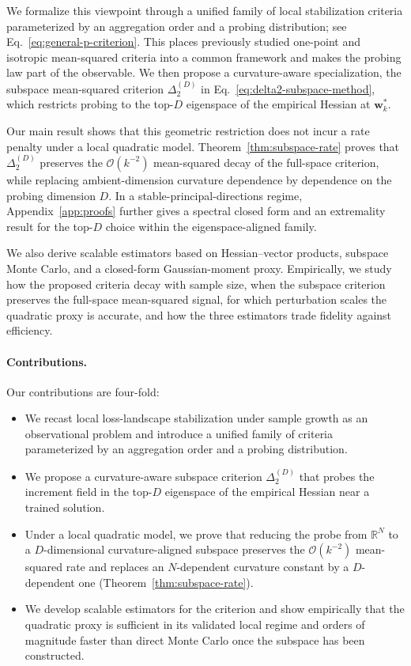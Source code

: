 \documentclass{article}
\begin{document}
We formalize this viewpoint through a unified family of local stabilization criteria parameterized by an aggregation order and a probing distribution; see Eq.~\eqref{eq:general-p-criterion}. This places previously studied one-point and isotropic mean-squared criteria into a common framework and makes the probing law part of the observable. We then propose a curvature-aware specialization, the subspace mean-squared criterion $\Delta_2^{(D)}$ in Eq.~\eqref{eq:delta2-subspace-method}, which restricts probing to the top-$D$ eigenspace of the empirical Hessian at $\mathbf w_k^*$.

Our main result shows that this geometric restriction does not incur a rate penalty under a local quadratic model. Theorem~\ref{thm:subspace-rate} proves that $\Delta_2^{(D)}$ preserves the $\mathcal O(k^{-2})$ mean-squared decay of the full-space criterion, while replacing ambient-dimension curvature dependence by dependence on the probing dimension $D$. In a stable-principal-directions regime, Appendix~\ref{app:proofs} further gives a spectral closed form and an extremality result for the top-$D$ choice within the eigenspace-aligned family.

We also derive scalable estimators based on Hessian--vector products, subspace Monte Carlo, and a closed-form Gaussian-moment proxy. Empirically, we study how the proposed criteria decay with sample size, when the subspace criterion preserves the full-space mean-squared signal, for which perturbation scales the quadratic proxy is accurate, and how the three estimators trade fidelity against efficiency.

\paragraph{Contributions.}
Our contributions are four-fold:
\begin{itemize}
    \item We recast local loss-landscape stabilization under sample growth as an observational problem and introduce a unified family of criteria parameterized by an aggregation order and a probing distribution.
    \item We propose a curvature-aware subspace criterion $\Delta_2^{(D)}$ that probes the increment field in the top-$D$ eigenspace of the empirical Hessian near a trained solution.
    \item Under a local quadratic model, we prove that reducing the probe from $\mathbb R^N$ to a $D$-dimensional curvature-aligned subspace preserves the $\mathcal O(k^{-2})$ mean-squared rate and replaces an $N$-dependent curvature constant by a $D$-dependent one (Theorem~\ref{thm:subspace-rate}).
    \item We develop scalable estimators for the criterion and show empirically that the quadratic proxy is sufficient in its validated local regime and orders of magnitude faster than direct Monte Carlo once the subspace has been constructed.
\end{itemize}
\end{document}
